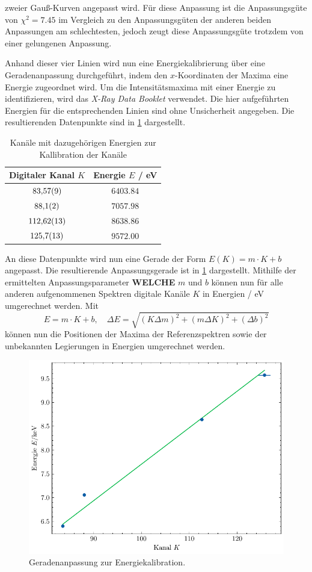 zweier Gauß-Kurven angepasst wird. Für diese Anpassung ist die Anpassungsgüte von $\chi^2 = \num{7.45}$ im Vergleich zu den Anpassungsgüten der anderen
beiden Anpassungen am schlechtesten, jedoch zeugt diese Anpassungsgüte trotzdem von einer gelungenen Anpassung.\par
Anhand dieser vier Linien wird nun eine Energiekalibrierung über eine Geradenanpassung durchgeführt, indem den $x$-Koordinaten der Maxima eine
Energie zugeordnet wird. Um die Intensitätsmaxima mit einer Energie zu identifizieren, wird das \textit{X-Ray Data Booklet} \cite{xraydata} verwendet.
Die hier aufgeführten Energien für die entsprechenden Linien sind ohne Unsicherheit angegeben.
Die resultierenden Datenpunkte sind in \cref{tab:callibration} dargestellt.
\begin{table}[H]
   \centering
\caption{Kanäle mit dazugehörigen Energien zur Kallibration der Kanäle}
\begin{tabular}{c c}
\hline Digitaler Kanal $K$ & Energie $E$ / \unit{\electronvolt} \\ 
\hline
$\num{83.57\pm 0.09}$ & $\num{6403.84}$ \\
$\num{88.1\pm 0.2}$ & $\num{7057.98}$ \\
$\num{112.62\pm 0.13}$ & $\num{8638.86}$ \\
$\num{125.7\pm 1.3}$ & $\num{9572.00}$ \\
\hline\end{tabular}
\label{tab:callibration}
\end{table}
An diese Datenpunkte wird nun eine Gerade der Form $E(K) = m \cdot K + b$ angepasst. Die resultierende Anpassungsgerade ist in \cref{fig:kalibrationskurve}
dargestellt. Mithilfe der ermittelten Anpassungsparameter \textbf{WELCHE} $m$ und $b$ können nun für alle anderen aufgenommenen Spektren digitale Kanäle $K$ in Energien
/ \unit{\electronvolt} umgerechnet werden. Mit
\begin{equation*}
    E = m \cdot K + b , \quad \Delta E = \sqrt{(K \Delta m)^2 + (m \Delta K)^2 + (\Delta b)^2}
\end{equation*} können nun die Positionen der Maxima der Referenzspektren sowie der unbekannten Legierungen in Energien umgerechnet werden.
\begin{figure}[H]
	\centering
	\includegraphics[width=0.6\linewidth]{../figs/kallibrationskurve.pdf}
	\caption{Geradenanpassung zur Energiekalibration.}
	\label{fig:kalibrationskurve}
\end{figure}